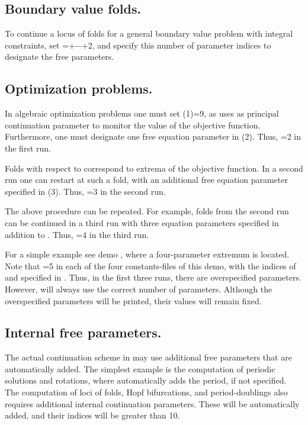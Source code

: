 \subsection{ Boundary value folds.}
To continue a locus of folds for a general boundary value problem
with integral constraints, set =+$-$+2, 
and specify this number of parameter indices to designate the free parameters.

\subsection{ Optimization problems.}
In algebraic optimization problems one must set (1)=9,
as \AUTO uses  as principal continuation parameter
to monitor the value of the objective function.
Furthermore, one must designate one free equation parameter in (2). 
Thus, =2 in the first run.

Folds with respect to  correspond to extrema of the objective function.
In a second run one can restart at such a fold, with an additional
free equation parameter specified in (3).
Thus, =3 in the second run.

The above procedure can be repeated.
For example, folds from the second run can be continued in a third run
with three equation parameters specified in addition to .
Thus, =4 in the third run.

For a simple example see demo , where a four-parameter extremum
is located.
Note that =5 in each of the four constants-files of this demo, 
with the indices of  and  specified in .
Thus, in the first three runs, there are overspecified parameters.
However, \AUTO will always use the correct number of parameters.
Although the overspecified parameters will be printed, their values will
remain fixed. 

\subsection{ Internal free parameters.}
The actual continuation scheme in \AUTO may use additional free
parameters that are automatically added.
The simplest example is the computation of periodic solutions and rotations,
where \AUTO automatically adds the period, if not specified.
The computation of loci of folds, Hopf bifurcations, and period-doublings
also requires additional internal continuation parameters.
These will be automatically added, and their indices will be greater
than 10.


